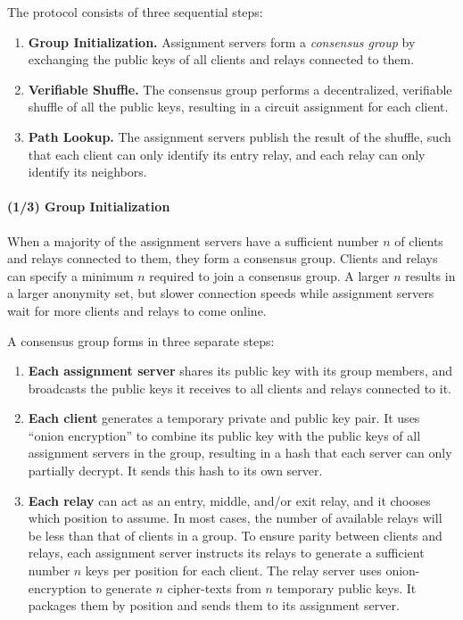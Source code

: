 The protocol consists of three sequential steps:

\begin{enumerate}
\item \textbf{Group Initialization.} Assignment servers form a \textit{consensus group} by exchanging the public keys of all clients and relays connected to them. 
\item \textbf{Verifiable Shuffle.} The consensus group performs a decentralized, 
verifiable shuffle of all the public keys, resulting in a circuit assignment for
each client.
\item \textbf{Path Lookup.} The assignment servers publish the result of the 
shuffle, such that each client can only identify its entry relay, and each relay
can only identify its neighbors. 
\end{enumerate}


\paragraph{(1/3) Group Initialization}

When a majority of the assignment servers have a sufficient number $n$ of
clients and relays connected to them, they form a consensus group. Clients and
relays can specify a minimum $n$ required to join a consensus group. A larger
$n$ results in a larger anonymity set, but slower connection speeds while
assignment servers wait for more clients and relays to come online.

A consensus group forms in three separate steps:

\begin{enumerate} 

\item \textbf{Each assignment server} shares its public key with its group
members, and broadcasts the public keys it receives to all clients and relays
connected to it.

\item \textbf{Each client} generates a temporary private and public key pair.
It uses ``onion encryption'' to combine its public key with the public keys of
all assignment servers in the group, resulting in a hash that each server can
only partially decrypt. It sends this hash to its own server.

\item \textbf{Each relay} can act as an entry, middle, and/or exit relay, and
it chooses which position to assume. In most cases, the number of available
relays will be less than that of clients in a group. To ensure parity between
clients and relays, each assignment server instructs its relays to generate a
sufficient number $n$ keys per position for each client. The relay server uses
onion-encryption to generate $n$ cipher-texts from $n$ temporary public keys.
It packages them by position and sends them to its assignment server.
\end{enumerate}

